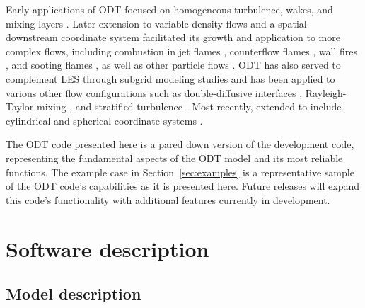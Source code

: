 \documentclass[preprint,12pt, a4paper]{elsarticle}
\begin{document}
Early applications of ODT focused on homogeneous turbulence, wakes, and mixing layers \cite{Kerstein_1999,Kerstein_2000,Kerstein_2001}. Later extension to variable-density flows and a spatial downstream coordinate system facilitated its growth and application to more complex flows, including combustion in jet flames \cite{Echekki_2001,Hewson_2001,Hewson_2002,Lignell_2012,Punati_2011,Abdelsamie_2017,Lignell_2017, Goshayeshi_2015}, counterflow flames \cite{Jozefik_2015}, wall fires \cite{Monson_2016}, and sooting flames \cite{Lignell_2015,Hewson_2006,Hewson_2009,Lignell_2015b,Ricks_2010}, as well as other particle flows \cite{Sun_2017,Schmidt_2009,Sun_2014,Fistler_2017}. ODT has also served to complement LES through subgrid modeling studies \cite{Cao_2008,Schmidt_2003,Schmidt_2010} and has been applied to various other flow configurations such as double-diffusive interfaces \cite{GonzalezJuez_2011}, Rayleigh-Taylor mixing \cite{GonzalezJuez_2013}, and stratified turbulence \cite{Wunsch_2001}. Most recently,   extended to include cylindrical and spherical coordinate systems \cite{Lignell_2018,Klein_2018,Klein_2019}.

  The ODT code presented here is a pared down version of the development code, representing the fundamental aspects of the ODT model and its most reliable functions. The example case in Section~\ref{sec:examples} is a representative sample of the ODT code's capabilities as it is presented here. Future releases will expand this code's functionality with additional features currently in development. 

\section{Software description}
\label{sec:description}

\subsection{Model description}
\label{sub:model_description}
\end{document}
